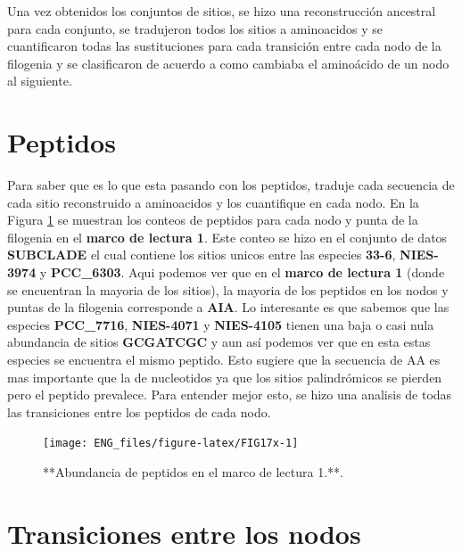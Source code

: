 \documentclass[
]{book}
\begin{document}
Una vez obtenidos los conjuntos de sitios, se hizo una reconstrucción ancestral para cada conjunto, se tradujeron todos los sitios a aminoacidos y se cuantificaron todas las sustituciones para cada transición entre cada nodo de la filogenia y se clasificaron de acuerdo a como cambiaba el aminoácido de un nodo al siguiente.

\hypertarget{peptidos}{%
\section{Peptidos}\label{peptidos}}

Para saber que es lo que esta pasando con los peptidos, traduje cada secuencia de cada sitio reconstruido a aminoacidos y los cuantifique en cada nodo. En la Figura \ref{fig:FIG17x} se muestran los conteos de peptidos para cada nodo y punta de la filogenia en el \textbf{marco de lectura 1}. Este conteo se hizo en el conjunto de datos \textbf{SUBCLADE} el cual contiene los sitios unicos entre las especies \textbf{33-6}, \textbf{NIES-3974} y \textbf{PCC\_6303}. Aqui podemos ver que en el \textbf{marco de lectura 1} (donde se encuentran la mayoria de los sitios), la mayoria de los peptidos en los nodos y puntas de la filogenia corresponde a \textbf{AIA}. Lo interesante es que sabemos que las especies \textbf{PCC\_7716}, \textbf{NIES-4071} y \textbf{NIES-4105} tienen una baja o casi nula abundancia de sitios \textbf{GCGATCGC} y aun así podemos ver que en esta estas especies se encuentra el mismo peptido. Esto sugiere que la secuencia de AA es mas importante que la de nucleotidos ya que los sitios palindrómicos se pierden pero el peptido prevalece. Para entender mejor esto, se hizo una analisis de todas las transiciones entre los peptidos de cada nodo.

\begin{figure}

{\centering \texttt{[image: ENG\_files/figure-latex/FIG17x-1]} 

}

\caption{**Abundancia de peptidos en el marco de lectura 1.**.}\label{fig:FIG17x}
\end{figure}

\hypertarget{transiciones-entre-los-nodos}{%
\section{Transiciones entre los nodos}\label{transiciones-entre-los-nodos}}
\end{document}
